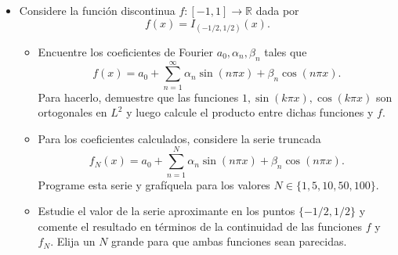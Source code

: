 \documentclass[9pt]{article}
\newcommand{\R}{\mathbb{R}}
\newcommand{\pts}[1]{[{\bf #1 puntos}] }
\begin{document}
\begin{itemize}
\begin{enumerate}
        \end{enumerate}
    \item Considere la función discontinua $f:[-1,1]\to \R$ dada por
            $$ f(x) = I_{(-1/2,1/2)}(x). $$
            \begin{itemize}
                \item\pts{2} Encuentre los coeficientes de Fourier $a_0, \alpha_n, \beta_n$ tales que 
                    $$ f(x) = a_0 + \sum_{n=1}^\infty \alpha_n \sin(n\pi x) + \beta_n \cos(n\pi x). $$
                    Para hacerlo, demuestre que las funciones $1,\sin(k\pi x), \cos(k\pi x)$ son ortogonales en $L^2$ y luego calcule el producto entre dichas funciones y $f$.
                \item\pts{3} Para los coeficientes calculados, considere la serie truncada
                    $$ f_N(x) = a_0 + \sum_{n=1}^N \alpha_n \sin(n\pi x) + \beta_n \cos(n\pi x). $$
                    Programe esta serie y grafíquela para los valores $N\in \{1,5,10,50,100\}$.
                \item\pts{2} Estudie el valor de la serie aproximante en los puntos $\{-1/2,1/2\}$ y comente el resultado en términos de la continuidad de las funciones $f$ y $f_N$. Elija un $N$ grande para que ambas funciones sean parecidas. 
            \end{itemize}
\end{itemize} %

\vspace{1cm}
\end{document}
